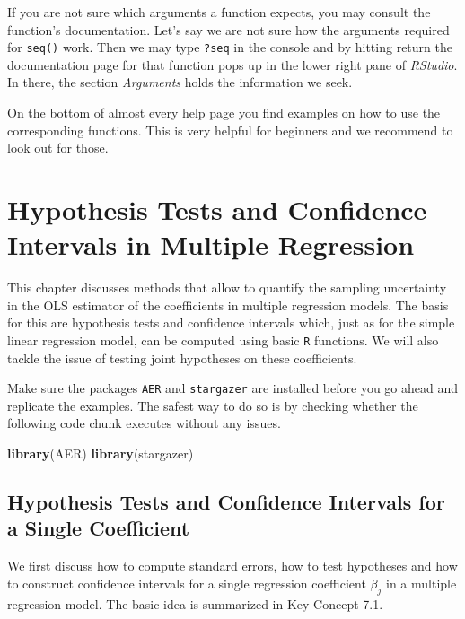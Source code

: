 \documentclass[]{book}
\newenvironment{Shaded}{\begin{snugshade}}{\end{snugshade}}
\newcommand{\KeywordTok}[1]{\textcolor[rgb]{0.13,0.29,0.53}{\textbf{#1}}}
\newcommand{\NormalTok}[1]{#1}
\theoremstyle{definition}
\theoremstyle{definition}
\theoremstyle{definition}
\theoremstyle{remark}
\begin{document}
If you are not sure which arguments a function expects, you may consult
the function's documentation. Let's say we are not sure how the
arguments required for \texttt{seq()} work. Then we may type
\texttt{?seq} in the console and by hitting return the documentation
page for that function pops up in the lower right pane of
\emph{RStudio}. In there, the section \emph{Arguments} holds the
information we seek.

On the bottom of almost every help page you find examples on how to use
the corresponding functions. This is very helpful for beginners and we
recommend to look out for those.

\chapter{Hypothesis Tests and Confidence Intervals in Multiple
Regression}\label{htaciimr}

This chapter discusses methods that allow to quantify the sampling
uncertainty in the OLS estimator of the coefficients in multiple
regression models. The basis for this are hypothesis tests and
confidence intervals which, just as for the simple linear regression
model, can be computed using basic \texttt{R} functions. We will also
tackle the issue of testing joint hypotheses on these coefficients.

Make sure the packages \texttt{AER} \citep{R-AER} and \texttt{stargazer}
\citep{R-stargazer} are installed before you go ahead and replicate the
examples. The safest way to do so is by checking whether the following
code chunk executes without any issues.

\begin{Shaded}
\begin{Highlighting}[]
\KeywordTok{library}\NormalTok{(AER)}
\KeywordTok{library}\NormalTok{(stargazer)}
\end{Highlighting}
\end{Shaded}

\section{Hypothesis Tests and Confidence Intervals for a Single
Coefficient}\label{hypothesis-tests-and-confidence-intervals-for-a-single-coefficient}

We first discuss how to compute standard errors, how to test hypotheses
and how to construct confidence intervals for a single regression
coefficient \(\beta_j\) in a multiple regression model. The basic idea
is summarized in Key Concept 7.1.
\end{document}
